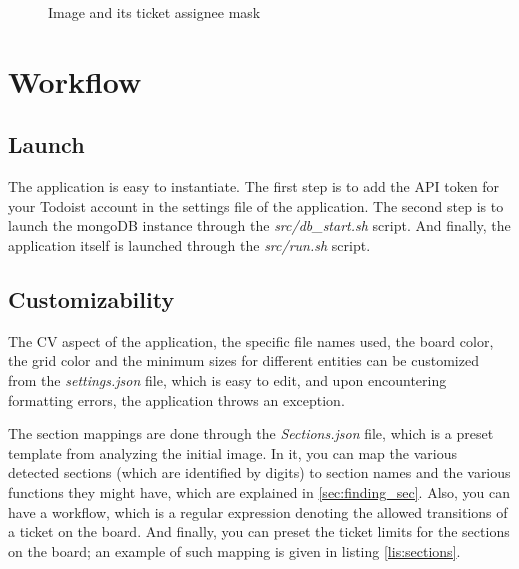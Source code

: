 \documentclass[12pt]{report}
\theoremstyle{definition}
\theoremstyle{remark}
\begin{document}
\begin{figure}[h]%
    \centering
    \qquad
    \caption{Image and its ticket assignee mask}%
    \label{fig:assignee_masks}%
\end{figure}


\chapter{Workflow}
\section{Launch}
The application is easy to instantiate. The first step is to add the API token for your Todoist account in the settings file of the application. The second step is to launch the mongoDB instance through the \textit{src/db\_start.sh} script. And finally, the application itself is launched through the \textit{src/run.sh} script.
\section{Customizability}
The CV aspect of the application, the specific file names used, the board color, the grid color and the minimum sizes for different entities can be customized from the \textit{settings.json} file, which is easy to edit, and upon encountering formatting errors, the application throws an exception.

The section mappings are done through the \textit{Sections.json} file, which is a preset template from analyzing the initial image. In it, you can map the various detected sections (which are identified by digits) to section names and the various functions they might have, which are explained in \autoref{sec:finding_sec}. Also, you can have a workflow, which is a regular expression denoting the allowed transitions of a ticket on the board. And finally, you can preset the ticket limits for the sections on the board; an example of such mapping is given in listing \ref{lis:sections}.
\end{document}
